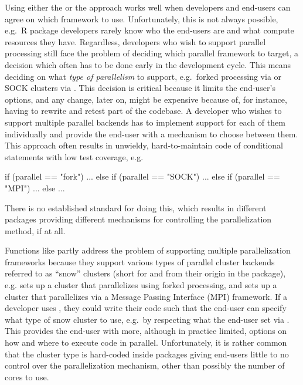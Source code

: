 Using either the  or the  approach
works well when developers and end-users can agree on which framework
to use. Unfortunately, this is not always possible, e.g.\ R package
developers rarely know who the end-users are and what compute
resources they have. Regardless, developers who wish to support
parallel processing still face the problem of deciding which parallel
framework to target, a decision which often has to be done early in
the development cycle. This means deciding on what \emph{type of
parallelism} to support, e.g.\ forked processing via 
or SOCK clusters via . This decision is critical
because it limits the end-user's options, and any change, later on,
might be expensive because of, for instance, having to rewrite and
retest part of the codebase. A developer who wishes to support
multiple parallel backends has to implement support for each of them
individually and provide the end-user with a mechanism to choose
between them. This approach often results in unwieldy,
hard-to-maintain code of conditional statements with low test
coverage, e.g.
\begin{example}
if (parallel == "fork") {
  ...
} else if (parallel == "SOCK") {
  ...
} else if (parallel == "MPI") {
  ...
} else {
  ...
}
\end{example}
There is no established standard for doing this, which results in
different packages providing different mechanisms for controlling the
parallelization method, if at all.

Functions like  partly address the problem of
supporting multiple parallelization frameworks because they support
various types of parallel cluster backends referred to as ``snow''
clusters (short for  and from
their origin in the  package), e.g.
 sets up a cluster that
parallelizes using forked processing, and
 sets up a cluster that
parallelizes via a Message Passing Interface (MPI) framework.  If a
developer uses , they could write their code such
that the end-user can specify what type of snow cluster to use, e.g.\
by respecting what the end-user set
via .  This provides the end-user
with more, although in practice limited, options on how and where to
execute code in parallel. Unfortunately, it is rather common that the
cluster type is hard-coded inside packages giving end-users little to
no control over the parallelization mechanism, other than possibly the
number of cores to use.

